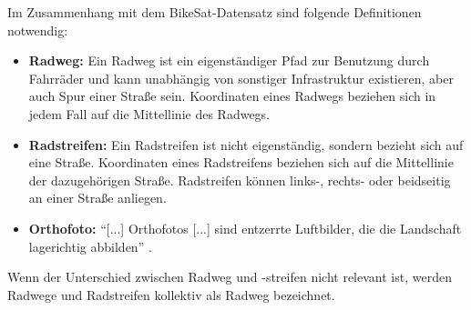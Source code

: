 Im Zusammenhang mit dem BikeSat-Datensatz sind folgende Definitionen notwendig: 
\begin{itemize}
	\item \textbf{Radweg:} Ein Radweg ist ein eigenständiger Pfad zur Benutzung durch Fahrräder 
	und kann unabhängig von sonstiger Infrastruktur existieren, aber auch Spur einer Straße sein. 
	Koordinaten eines Radwegs beziehen sich in jedem Fall auf die Mittellinie des Radwegs.  
	\item \textbf{Radstreifen:} Ein Radstreifen ist nicht eigenständig, sondern bezieht sich auf eine Straße. 
	Koordinaten eines Radstreifens beziehen sich auf die Mittellinie der dazugehörigen Straße. 
	Radstreifen können links-, rechts- oder beidseitig an einer Straße anliegen. 
	\item \textbf{Orthofoto:} 
	\enquote{[...] Orthofotos [...] sind entzerrte Luftbilder, die die Landschaft lagerichtig abbilden} \cite{dop27022023}.
\end{itemize}
Wenn der Unterschied zwischen Radweg und -streifen nicht relevant ist, werden Radwege und Radstreifen
kollektiv als Radweg bezeichnet.  

